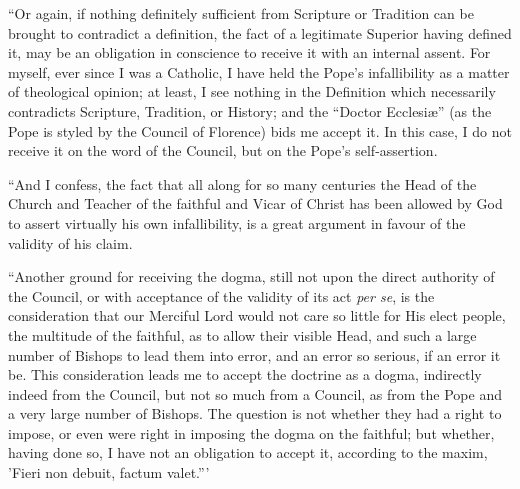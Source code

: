 ``Or again, if nothing definitely sufficient from Scripture or
Tradition can be brought to contradict a definition, the fact of a
legitimate Superior having defined it, may be an obligation in
conscience to receive it with an internal assent. For myself, ever since
I was a Catholic, I have held the Pope's infallibility as a matter of
theological opinion; at least, I see nothing in the Definition which
necessarily contradicts Scripture, Tradition, or History; and the
``Doctor Ecclesiæ'' (as the Pope is styled by the Council of
Florence) bids me accept it. In this case, I do not receive it on the
word of the Council, but on the Pope's self-assertion.

``And I confess, the fact that all along for so many centuries
the Head of the Church and Teacher of the faithful and Vicar of Christ
has been allowed by God to assert virtually his own infallibility, is a
great argument in favour of the validity of his claim.

``Another ground for receiving the dogma, still not upon the
direct authority of the Council, or with acceptance of the validity of
its act \emph{per se}, is the consideration that our Merciful Lord would
not care so little for His elect people, the multitude of the faithful,
as to allow their visible Head, and such a large number of Bishops to
lead them into error, and an error so serious, if an error it be. This
consideration leads me to accept the doctrine as a dogma, indirectly
indeed from the Council, but not so much from a Council, as from the
Pope and a very large number of Bishops. The question is not whether
they had a right to impose, or even were right in imposing the dogma on
the faithful; but whether, having done so, I have not an obligation to
accept it, according to the maxim, 'Fieri non debuit, factum
valet.'''

